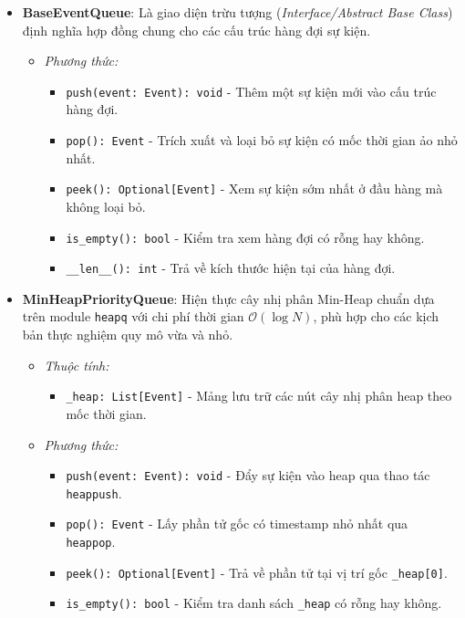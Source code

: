 \begin{itemize}[leftmargin=1.5em, itemsep=8pt]
\item \textbf{BaseEventQueue}: Là giao diện trừu tượng (\textit{Interface/Abstract Base Class}) định nghĩa hợp đồng chung cho các cấu trúc hàng đợi sự kiện.

\begin{itemize}[leftmargin=1.2em, label={}, itemsep=3pt]
\item[\textendash] \textit{Phương thức:}
\begin{itemize}[leftmargin=1.5em, label=+, itemsep=2pt]
\item \texttt{push(event: Event): void} - Thêm một sự kiện mới vào cấu trúc hàng đợi.
\item \texttt{pop(): Event} - Trích xuất và loại bỏ sự kiện có mốc thời gian ảo nhỏ nhất.
\item \texttt{peek(): Optional[Event]} - Xem sự kiện sớm nhất ở đầu hàng mà không loại bỏ.
\item \texttt{is\_empty(): bool} - Kiểm tra xem hàng đợi có rỗng hay không.
\item \texttt{\_\_len\_\_(): int} - Trả về kích thước hiện tại của hàng đợi.
\end{itemize}
\end{itemize}

\item \textbf{MinHeapPriorityQueue}: Hiện thực cây nhị phân Min-Heap chuẩn dựa trên module \texttt{heapq} với chi phí thời gian $\mathcal{O}(\log N)$, phù hợp cho các kịch bản thực nghiệm quy mô vừa và nhỏ.

\begin{itemize}[leftmargin=1.2em, label={}, itemsep=3pt]
\item[\textendash] \textit{Thuộc tính:}
\begin{itemize}[leftmargin=1.5em, label=+, itemsep=2pt]
\item \texttt{\_heap: List[Event]} - Mảng lưu trữ các nút cây nhị phân heap theo mốc thời gian.
\end{itemize}

\item[\textendash] \textit{Phương thức:}
\begin{itemize}[leftmargin=1.5em, label=+, itemsep=2pt]
\item \texttt{push(event: Event): void} - Đẩy sự kiện vào heap qua thao tác \texttt{heappush}.
\item \texttt{pop(): Event} - Lấy phần tử gốc có timestamp nhỏ nhất qua \texttt{heappop}.
\item \texttt{peek(): Optional[Event]} - Trả về phần tử tại vị trí gốc \texttt{\_heap[0]}.
\item \texttt{is\_empty(): bool} - Kiểm tra danh sách \texttt{\_heap} có rỗng hay không.
\end{itemize}
\end{itemize}


\end{itemize}

